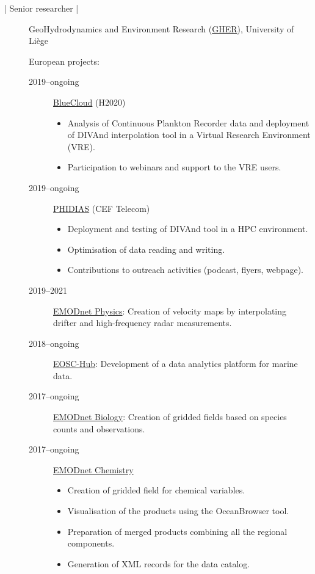 \documentclass[10pt,a4paper,svgnames]{article}
\begin{document}
\begin{description}
\item[ | Senior researcher |] GeoHydrodynamics and Environment Research (\href{http://modb.oce.ulg.ac.be/}{GHER}), University of Liège

European projects:
\begin{description}

\item[2019--ongoing] \href{https://www.blue-cloud.org/}{BlueCloud} (H2020)
\begin{itemize}
\item Analysis of Continuous Plankton Recorder data and deployment of \mbox{DIVAnd} interpolation tool in a Virtual Research Environment (VRE).
\item Participation to webinars and support to the VRE users.
\end{itemize}

\item[2019--ongoing] \href{https://www.phidias-hpc.eu/}{PHIDIAS} (CEF Telecom)
\begin{itemize}
\item Deployment and testing of DIVAnd tool in a HPC environment.
\item Optimisation of data reading and writing.
\item Contributions to outreach activities (podcast, flyers, webpage).
\end{itemize}

\item[2019--2021] \href{https://www.emodnet-physics.eu}{EMODnet Physics}: Creation of velocity maps by interpolating drifter and high-frequency radar measurements. 


\item[2018--ongoing] \href{https://www.eosc-hub.eu}{EOSC-Hub}: Development of a data analytics platform for marine data.

\item[2017--ongoing] \href{https://emodnet-biology.eu}{EMODnet Biology}: Creation of gridded fields based on species counts and observations.

\item[2017--ongoing] \href{https://www.emodnet-chemistry.eu}{EMODnet Chemistry} 
\begin{itemize}
\item Creation of gridded field for chemical variables.
\item Visualisation of the products using the OceanBrowser tool.
\item Preparation of merged products combining all the regional components.
\item Generation of XML records for the data catalog.
\end{itemize}


\end{description}
\end{description}
\end{document}
